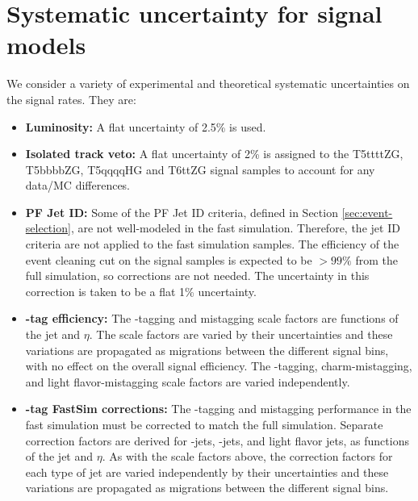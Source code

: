 \section{Systematic uncertainty for signal models}
\label{sec:signal-systematics}
We consider a variety of experimental and theoretical systematic uncertainties on the signal rates. They are:
\begin{itemize}
\item {\bf Luminosity:} A flat uncertainty of 2.5\% is used.
\item {\bf Isolated track veto:} A flat uncertainty of 2\% is assigned to the 
T5ttttZG, T5bbbbZG, T5qqqqHG and T6ttZG signal samples to account for any data/MC 
differences.
\item {\bf PF Jet ID:} Some of the PF Jet ID criteria, defined in Section \ref{sec:event-selection}, are not well-modeled in the fast simulation. Therefore, the jet ID criteria are not applied to the fast simulation samples. The efficiency of the event cleaning cut on the signal samples is expected to be ${>}99\%$ from the full simulation, so corrections are not needed. The uncertainty in this correction is taken to be a flat 1\% uncertainty.
\item {\bf \cPqb-tag efficiency:} The \cPqb-tagging and mistagging scale factors are functions of the jet \pt and $\eta$.
The scale factors are varied by their
uncertainties and these variations are propagated as migrations between the different signal bins, with no effect on the overall signal efficiency. The \cPqb-tagging,
charm-mistagging, and light flavor-mistagging scale factors are varied independently.
\item {\bf \cPqb-tag FastSim corrections:} The \cPqb-tagging and mistagging performance in the fast simulation must be corrected to match the full
simulation. Separate correction factors are derived for \cPqb-jets, \cPqc-jets, and light flavor jets, as functions of the jet \pt and $\eta$. As with the scale factors above, the correction factors for each type of jet are varied independently by their uncertainties
and these variations are propagated as migrations between the different signal bins.


\end{itemize}
